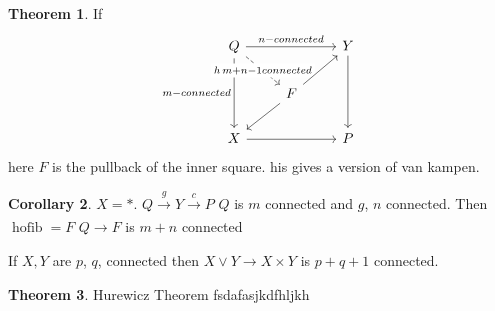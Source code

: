 \documentclass[notitlepage, 12pt]{article}
\theoremstyle{definition}
\newtheorem{theorem}{Theorem}[section]
\newtheorem{corollary}[theorem]{Corollary}
\theoremstyle{para}
\begin{document}
\begin{theorem}
     If 
     \[
      \begin{tikzcd}
Q \arrow[dd, "m-connected"'] \arrow[rr, "n-connected"] \arrow[rd, "h\, m+n-1 connected" description, dashed] &                          & Y \arrow[dd] \\
                                                                                                          & F \arrow[ld] \arrow[ru] &              \\
X \arrow[rr]                                                                                              &                          & P           
\end{tikzcd}
     \] here $F$ is the pullback of the inner square. his gives a version of van kampen. 

\end{theorem}
\begin{corollary}
  $X=\ast$. $Q\xrightarrow[ ]{g }Y \xrightarrow[ ]{c }P$ $Q$ is $m$ connected and $g$, $n$ connected. Then $\mathop{\mathrm{hofib }}=F$ $Q\to F$ is $m+n$ connected 
\end{corollary}

If $X,Y$ are $p$, $q$, connected then $X\vee Y \to X\times Y$ is $p+q+1$ connected.

\begin{theorem}{Hurewicz Theorem }
  fsdafasjkdfhljkh
\end{theorem}
\end{document}
